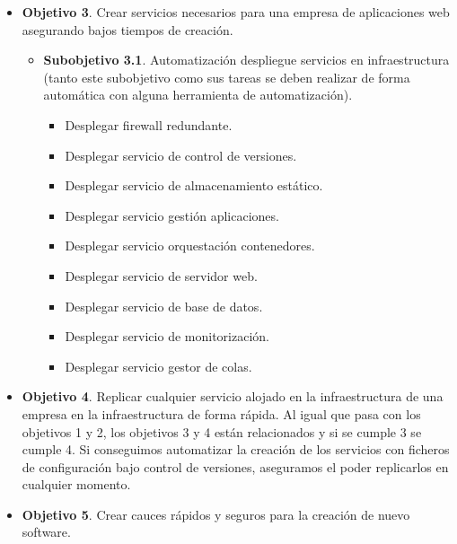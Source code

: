 \begin{text}
\begin{itemize}
                                \item \textbf{Objetivo 3}. Crear servicios necesarios para una empresa de aplicaciones web asegurando bajos tiempos de creación.
                                \begin{itemize}
                                        \item \textbf{Subobjetivo 3.1}. Automatización despliegue servicios en infraestructura (tanto este subobjetivo como sus tareas se deben realizar de forma automática con alguna herramienta de automatización).
                                        \begin{itemize}
                                                \item Desplegar firewall redundante.
                                                \item Desplegar servicio de control de versiones.
                                                \item Desplegar servicio de almacenamiento estático.
                                                \item Desplegar servicio gestión aplicaciones.
                                                \item Desplegar servicio orquestación contenedores.
                                                \item Desplegar servicio de servidor web.
                                                \item Desplegar servicio de base de datos.
                                                \item Desplegar servicio de monitorización.
                                                \item Desplegar servicio gestor de colas.
                                        \end{itemize}
                                \end{itemize}
                                \item \textbf{Objetivo 4}. Replicar cualquier servicio alojado en la infraestructura de una empresa en la infraestructura de forma rápida. Al igual que pasa con los objetivos 1 y 2, los objetivos 3 y 4 están relacionados y si se cumple 3 se cumple 4. Si conseguimos automatizar la creación de los servicios con ficheros de configuración bajo control de versiones, aseguramos el poder replicarlos en cualquier momento.
                                \item \textbf{Objetivo 5}. Crear cauces rápidos y seguros para la creación de nuevo software.

\end{itemize}
\end{text}
